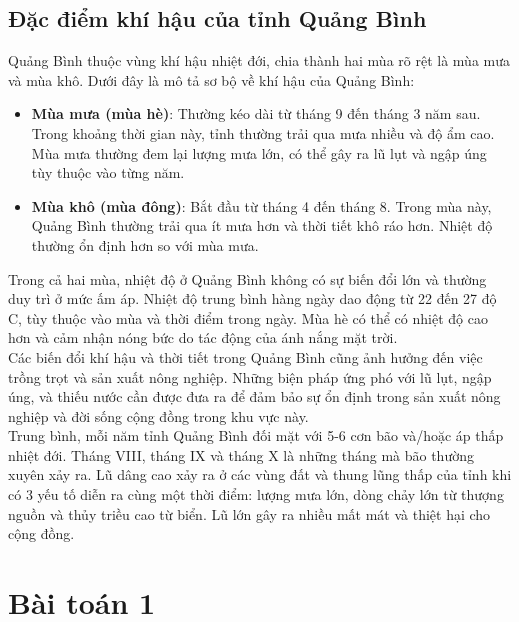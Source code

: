 \documentclass[12pt]{report}
\begin{document}
\section*{Đặc điểm khí hậu của tỉnh Quảng Bình} %
\begin{flushleft}
	Quảng Bình thuộc vùng khí hậu nhiệt đới, chia thành hai mùa rõ rệt là mùa mưa và mùa khô. Dưới đây là mô tả sơ bộ về khí hậu của Quảng Bình:
	\begin{itemize}
		\item \textbf{Mùa mưa (mùa hè)}: Thường kéo dài từ tháng 9 đến tháng 3 năm sau. Trong khoảng thời gian này, tỉnh thường trải qua mưa nhiều và độ ẩm cao. Mùa mưa thường đem lại lượng mưa lớn, có thể gây ra lũ lụt và ngập úng tùy thuộc vào từng năm.

		\item \textbf{Mùa khô (mùa đông)}: Bắt đầu từ tháng 4 đến tháng 8. Trong mùa này, Quảng Bình thường trải qua ít mưa hơn và thời tiết khô ráo hơn. Nhiệt độ thường ổn định hơn so với mùa mưa.
	\end{itemize}

	Trong cả hai mùa, nhiệt độ ở Quảng Bình không có sự biến đổi lớn và thường duy trì ở mức ấm áp. Nhiệt độ trung bình hàng ngày dao động từ 22 đến 27 độ C, tùy thuộc vào mùa và thời điểm trong ngày. Mùa hè có thể có nhiệt độ cao hơn và cảm nhận nóng bức do tác động của ánh nắng mặt trời.
	\\[\baselineskip]

	Các biến đổi khí hậu và thời tiết trong Quảng Bình cũng ảnh hưởng đến việc trồng trọt và sản xuất nông nghiệp. Những biện pháp ứng phó với lũ lụt, ngập úng, và thiếu nước cần được đưa ra để đảm bảo sự ổn định trong sản xuất nông nghiệp và đời sống cộng đồng trong khu vực này.
	\\[\baselineskip]

	Trung bình, mỗi năm tỉnh Quảng Bình đối mặt với 5-6 cơn bão và/hoặc áp thấp nhiệt đới. Tháng VIII, tháng IX và tháng X là những tháng mà bão thường xuyên xảy ra. Lũ dâng cao xảy ra ở các vùng đất và thung lũng thấp của tỉnh khi có 3 yếu tố diễn ra cùng một thời điểm: lượng mưa lớn, dòng chảy lớn từ thượng nguồn và thủy triều cao từ biển. Lũ lớn gây ra nhiều mất mát và thiệt hại cho cộng đồng.
\end{flushleft}

\chapter{Bài toán 1}
\end{document}
